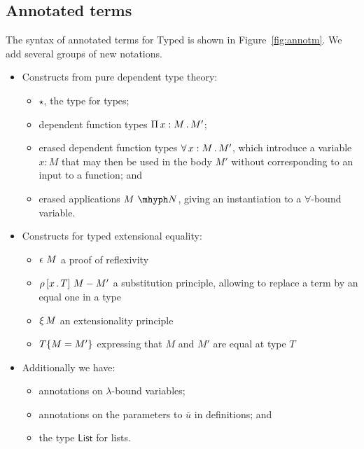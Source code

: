 \documentclass{article}
\begin{document}
\subsection{Annotated terms}

The syntax of annotated terms for Typed \sar is shown in
Figure~\ref{fig:annotm}.  We add several groups of new notations.
\begin{itemize}
\item Constructs from pure dependent type theory:
  \begin{itemize}
  \item $\star$, the type for types;
  \item dependent function types $\Pia{x}{M}{M'}$;
  \item erased dependent function types $\allt{x}{M}{M'}$, which introduce a variable $x:M$ that
    may then be used in the body $M'$ without corresponding to an input to a function; and
  \item erased applications $\appe{M}{N}$, giving an instantiation to a $\forall$-bound variable.
  \end{itemize}
\item Constructs for typed extensional equality:
  \begin{itemize}
  \item $\rfl{M}$ a proof of reflexivity
  \item $\cng{x}{T}{M}{M'}$ a substitution principle, allowing to replace a term by an equal one in a type
  \item $\ext{M}$ an extensionality principle
  \item $\eqtm{M}{T}{M'}$ expressing that $M$ and $M'$ are equal at type $T$
  \end{itemize}
\item Additionally we have:
\begin{itemize}
\item annotations on $\lambda$-bound variables;
\item annotations on the parameters to $\bar{u}$ in definitions; and
\item the type $\mathsf{List}$ for lists.
\end{itemize}
\end{itemize}
\end{document}
